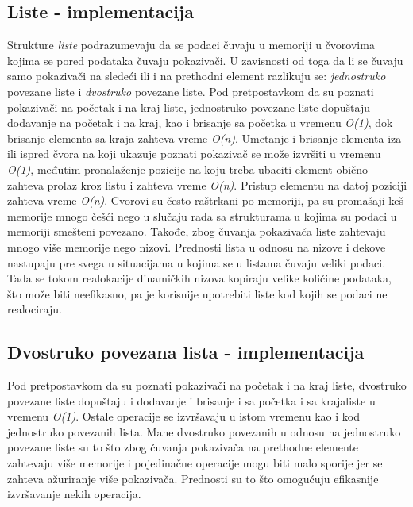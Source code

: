 \documentclass{article}
\begin{document}
\subsection{Liste - implementacija}
Strukture \textit{liste} podrazumevaju da se podaci čuvaju u memoriji u čvorovima
kojima se pored podataka čuvaju pokazivači. U zavisnosti od toga da li se čuvaju
samo pokazivači na sledeći ili i na prethodni element razlikuju se: \textit{jednostruko} povezane liste i \textit{dvostruko} povezane liste.
\newline Pod pretpostavkom da su poznati pokazivači na početak i na kraj liste, jednostruko povezane liste dopuštaju dodavanje na početak i na kraj, kao i brisanje
sa početka u vremenu \textit{O(1)}, dok brisanje elementa sa kraja zahteva vreme
\textit{O(n)}. Umetanje i brisanje elementa iza ili ispred čvora na koji ukazuje poznati
pokazivač se može izvršiti u vremenu \textit{O(1)}, međutim pronalaženje pozicije na
koju treba ubaciti element obično zahteva prolaz kroz listu i zahteva vreme \textit{O(n)}.
Pristup elementu na datoj poziciji zahteva vreme \textit{O(n)}.
\newline Cvorovi su često raštrkani po memoriji, pa su promašaji keš memorije
mnogo češći nego u slučaju rada sa strukturama u kojima su podaci u memoriji
smešteni povezano. Takođe, zbog čuvanja pokazivača liste zahtevaju mnogo više
memorije nego nizovi. Prednosti lista u odnosu na nizove i dekove nastupaju pre
svega u situacijama u kojima se u listama čuvaju veliki podaci. Tada se tokom
realokacije dinamičkih nizova kopiraju velike količine podataka, što može biti
neefikasno, pa je korisnije upotrebiti liste kod kojih se podaci ne realociraju.

\subsection{Dvostruko povezana lista - implementacija}
Pod pretpostavkom da su poznati pokazivači na početak i na kraj liste, dvostruko
povezane liste dopuštaju i dodavanje i brisanje i sa početka i sa krajaliste
u vremenu \textit{O(1)}. Ostale operacije se izvršavaju u istom vremenu kao i kod
jednostruko povezanih lista. Mane dvostruko povezanih u odnosu na jednostruko
povezane liste su to što zbog čuvanja pokazivača na prethodne elemente zahtevaju
više memorije i pojedinačne operacije mogu biti malo sporije jer se zahteva
ažuriranje više pokazivača. Prednosti su to što omogućuju efikasnije izvršavanje
nekih operacija.
\end{document}
